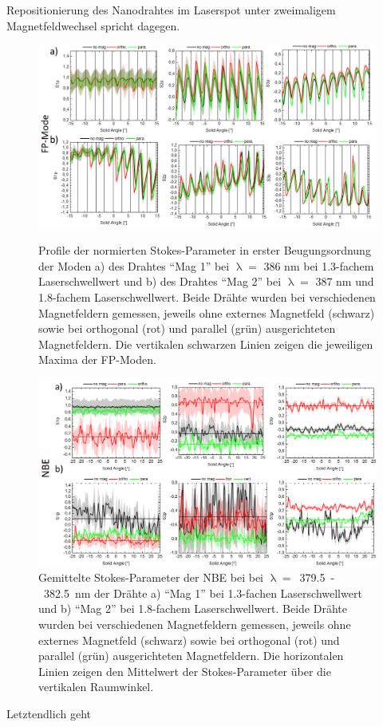 Repositionierung des Nanodrahtes im Laserspot unter zweimaligem
Magnetfeldwechsel spricht dagegen.\begin{figure}[h]
\includegraphics[width=1\textwidth]{Bilder/Mag/Stokes_Mag} \caption{Profile der
normierten Stokes-Parameter in erster Beugungsordnung der Moden a) des Drahtes
``Mag 1''  bei $\uplambda=$ 386 nm bei 1.3-fachem Laserschwellwert und b) des
Drahtes ``Mag 2'' bei $\uplambda=$ 387 nm und 1.8-fachem Laserschwellwert. Beide
Drähte wurden bei verschiedenen Magnetfeldern gemessen, jeweils ohne externes
Magnetfeld (schwarz) sowie bei orthogonal (rot) und parallel (grün)
ausgerichteten Magnetfeldern. Die vertikalen schwarzen Linien zeigen die
jeweiligen Maxima der FP-Moden.} \label{Stokes_Mag} \centering
\includegraphics[width=1\textwidth]{Bilder/Mag/Stokes_NBE_Mag}
\caption{Gemittelte Stokes-Parameter der NBE bei bei \mbox{$\uplambda=$ 379.5 -
382.5 nm} der Drähte a) ``Mag 1'' bei 1.3-fachen Laserschwellwert und b) ``Mag
2'' bei 1.8-fachem Laserschwellwert. Beide Drähte wurden bei verschiedenen
Magnetfeldern gemessen, jeweils ohne externes Magnetfeld (schwarz) sowie bei
orthogonal (rot) und parallel (grün) ausgerichteten Magnetfeldern. Die
horizontalen Linien zeigen den Mittelwert der Stokes-Parameter über die
vertikalen Raumwinkel.} \label{Stokes_NBE_Mag} \end{figure}  Letztendlich geht
